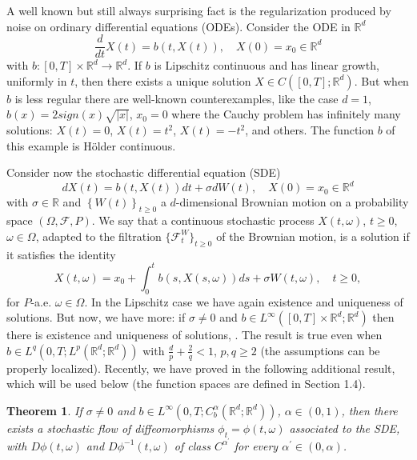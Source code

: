 \documentclass{article}
\newtheorem{theorem}{Theorem}
\begin{document}
A well known but still always surprising fact is the regularization produced
by noise on ordinary differential equations (ODEs). Consider the ODE in
$\mathbb{R}^{d}$
\[
\frac{d}{dt}X\left(  t\right)  =b\left(  t,X\left(  t\right)  \right)  ,\quad
X\left(  0\right)  =x_{0}\in\mathbb{R}^{d}%
\]
with $b:\left[  0,T\right]
\times\mathbb{R}^{d}\rightarrow\mathbb{R}^{d}$. If $b$ is Lipschitz
continuous and has linear growth, uniformly in $t$, then there
exists a unique solution $X\in C\left(  [  0,T]
;\mathbb{R}^{d}\right)  $. But when $b$ is less regular there are
well-known counterexamples, like the case $d=1$, $b\left(  x\right)
=2sign\left( x\right)  \sqrt{\left\vert x\right\vert }$, $x_{0}=0$
where the Cauchy problem has infinitely many solutions: $X\left(
t\right)  =0$, $X\left(  t\right) =t^{2}$, $\displaystyle{ X\left(  t\right)
=-t^{2}}$, and others. The function $b$ of this example is H\"{o}lder
continuous.

Consider now the stochastic differential equation (SDE)%
\begin{equation}
\label{SDE}dX\left(  t\right)  =b\left(  t,X\left(  t\right)  \right)
dt+\sigma dW\left(  t\right)  ,\quad X\left(  0\right)  =x_{0}\in
\mathbb{R}^{d}%
\end{equation}
with $\sigma\in\mathbb{R}$ and $\left\{  W\left(  t\right)  \right\}
_{t\geq0}$ a $d$-dimensional Brownian motion on a probability space
$\left( \Omega,{\mathcal F},P\right)  $. We say that a continuous
stochastic process $X\left( t,\omega\right)  $, $t\geq0$,
$\omega\in\Omega$, adapted to the filtration $\{ {\mathcal
F}_{t}^{W}\}_{t\geq 0}$ of the Brownian motion, is a solution if it
satisfies the identity
\[
X\left(  t,\omega\right)  =x_{0}+\int_{0}^{t}b\left( s, X\left(
s,\omega \right)  \right)  ds+ \sigma W\left(  t,\omega\right)
,\quad t\geq 0,
\]
for $P$-a.e. $\omega\in\Omega$. In the Lipschitz case we have again
existence and uniqueness of solutions. But now, we have more: if
$\sigma\neq0$ and $b\in
L^{\infty}\left(  \left[  0,T\right]  \times\mathbb{R}^{d};\mathbb{R}%
^{d}\right)  $ then there is existence and uniqueness of solutions, \cite{V}.
The result is true even when $b\in L^{q}\left(  0,T;L^{p}\left(
\mathbb{R}^{d};\mathbb{R}^{d}\right)  \right)  $ with $\frac{d}{p}+\frac{2}%
{q}<1$, $p,q\geq2$ \cite{Kry-Ro} (the assumptions can be properly localized).
Recently, we have proved in \cite{FGP}
the following additional result, which
 will be used below (the function spaces are defined in
 Section 1.4).

\begin{theorem}
If $\sigma\neq0$ and $b\in L^{\infty}\left(  0,T ;C_{b}^{\alpha}\left(
\mathbb{R}^{d};\mathbb{R}^{d}\right)  \right)  $,
 $\alpha \in (0,1)$, then there exists a
stochastic flow of diffeomorphisms $\phi_{t} = \phi\left(  t,\omega\right)  $
associated to the SDE, with $D\phi\left(  t,\omega\right)  $ and $D\phi
^{-1}\left(  t,\omega\right)  $ of class $C^{\alpha^{\prime}}$ for every
$\alpha^{\prime}\in\left(  0,\alpha\right)  $.
\end{theorem}
\end{document}
